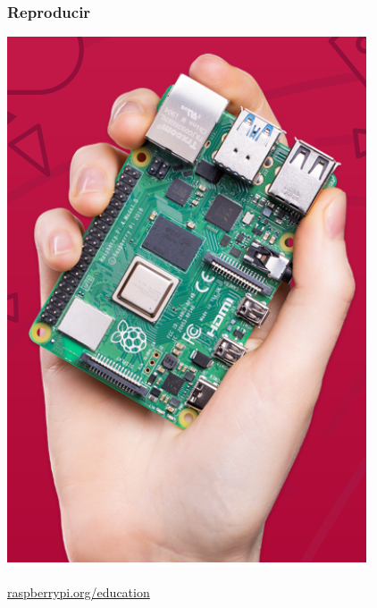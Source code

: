 \documentclass[17pt,aspectratio=169]{beamer}
\begin{document}

\begin{frame}
\frametitle{Reproducir}

\includegraphics[width=\linewidth]{figs/raspberry-pi}

\begin{flushright}
\href{https://raspberrypi.org/education}{raspberrypi.org/education}
\end{flushright}

\end{frame}

\end{document}
